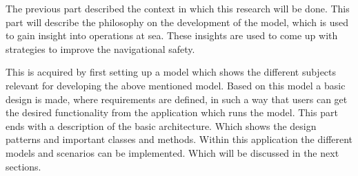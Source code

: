 The previous part described the context in which this research will be done. This part will describe the philosophy on the development of the model, which is used to gain insight into operations at sea. These insights are used to come up with strategies to improve the navigational safety.

This is acquired by first setting up a model which shows the different subjects relevant for developing the above mentioned model. Based on this model a basic design is made, where requirements are defined, in such a way that users can get the desired functionality from the application which runs the model.
This part ends with a description of the basic architecture. Which shows the design patterns and important classes and methods. Within this application the different models and scenarios can be implemented. Which will be discussed in the next sections.
